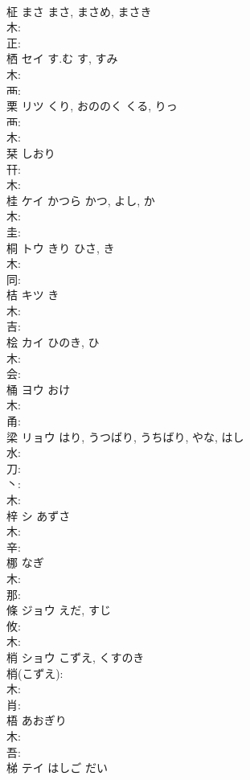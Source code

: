 \documentclass[8pt]{extreport}
\begin{document}
\begin{CJK}{UTF8}{min}
\\	柾	まさ	まさ, まさめ, まさき		
\\	木: 
\\	正: 
\\	栖	セイ	す.む	す, すみ	
\\	木: 
\\	襾: 
\\	栗	リツ	くり, おののく	くる, りっ	
\\	襾: 
\\	木: 
\\	栞		しおり			
\\	幵: 
\\	木: 
\\	桂	ケイ	かつら	かつ, よし, か	
\\	木: 
\\	圭: 
\\	桐	トウ	きり	ひさ, き	
\\	木: 
\\	同: 
\\	桔	キツ		き	
\\	木: 
\\	吉: 
\\	桧	カイ	ひのき, ひ		
\\	木: 
\\	会: 
\\	桶	ヨウ	おけ		
\\	木: 
\\	甬: 
\\	梁	リョウ	はり, うつばり, うちばり, やな, はし		
\\	水: 
\\	刀: 
\\	丶: 
\\	木: 
\\	梓	シ	あずさ		
\\	木: 
\\	辛: 
\\	梛		なぎ				
\\	木: 
\\	那: 
\\	條	ジョウ	えだ, すじ		
\\	攸: 
\\	木: 
\\	梢	ショウ	こずえ, くすのき		
\\	梢(こずえ): 
\\	木: 
\\	肖: 
\\	梧		あおぎり			
\\	木: 
\\	吾: 
\\	梯	テイ	はしご	だい	

\end{CJK}
\end{document}

